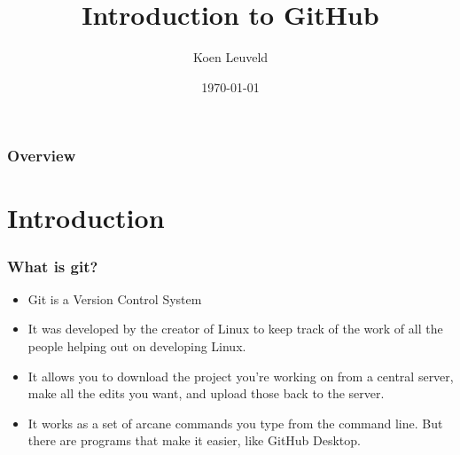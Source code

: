 \documentclass{beamer}
\title[Git]{Introduction to GitHub} %
\author{Koen Leuveld} %
\institute[EDI] %
{
EDI \\ %
\medskip
\textit{k.leuveld@surveybe.com} %
}
\date{\today} %
\begin{document}
\begin{frame}
\titlepage %
\end{frame}

\begin{frame}
\frametitle{Overview} %
\tableofcontents %
\end{frame}


\section{Introduction} %


\begin{frame}
\frametitle{What is git?}
\begin{itemize}
\item Git is a Version Control System
\item It was developed by the creator of Linux to keep track of the work of all the people helping out on developing Linux.
\item It allows you to download the project you’re working on from a central server, make all the edits you want, and upload those back to the server.
\item It works as a set of arcane commands you type from the command line. But there are programs that make it easier, like GitHub Desktop.
\end{itemize}
\end{frame}
\end{document}
